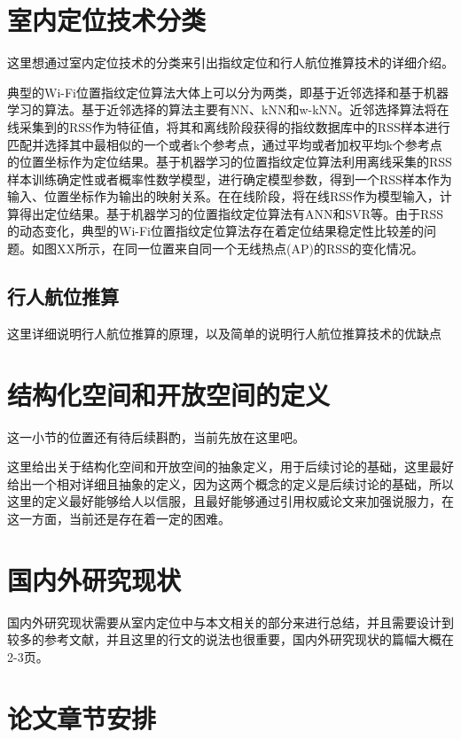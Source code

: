 \section{室内定位技术分类}

这里想通过室内定位技术的分类来引出指纹定位和行人航位推算技术的详细介绍。

典型的Wi-Fi位置指纹定位算法大体上可以分为两类，即基于近邻选择和基于机器学习的算法。基于近邻选择的算法主要有NN、kNN和w-kNN。近邻选择算法将在线采集到的RSS作为特征值，将其和离线阶段获得的指纹数据库中的RSS样本进行匹配并选择其中最相似的一个或者k个参考点，通过平均或者加权平均k个参考点的位置坐标作为定位结果。基于机器学习的位置指纹定位算法利用离线采集的RSS样本训练确定性或者概率性数学模型，进行确定模型参数，得到一个RSS样本作为输入、位置坐标作为输出的映射关系。在在线阶段，将在线RSS作为模型输入，计算得出定位结果。基于机器学习的位置指纹定位算法有ANN和SVR等。由于RSS的动态变化，典型的Wi-Fi位置指纹定位算法存在着定位结果稳定性比较差的问题。如图XX所示，在同一位置来自同一个无线热点(AP)的RSS的变化情况。

\subsection{行人航位推算}
这里详细说明行人航位推算的原理，以及简单的说明行人航位推算技术的优缺点




\section{结构化空间和开放空间的定义}

这一小节的位置还有待后续斟酌，当前先放在这里吧。

这里给出关于结构化空间和开放空间的抽象定义，用于后续讨论的基础，这里最好给出一个相对详细且抽象的定义，因为这两个概念的定义是后续讨论的基础，所以这里的定义最好能够给人以信服，且最好能够通过引用权威论文来加强说服力，在这一方面，当前还是存在着一定的困难。

\section{国内外研究现状}

国内外研究现状需要从室内定位中与本文相关的部分来进行总结，并且需要设计到较多的参考文献，并且这里的行文的说法也很重要，国内外研究现状的篇幅大概在2-3页。

\section{论文章节安排}

